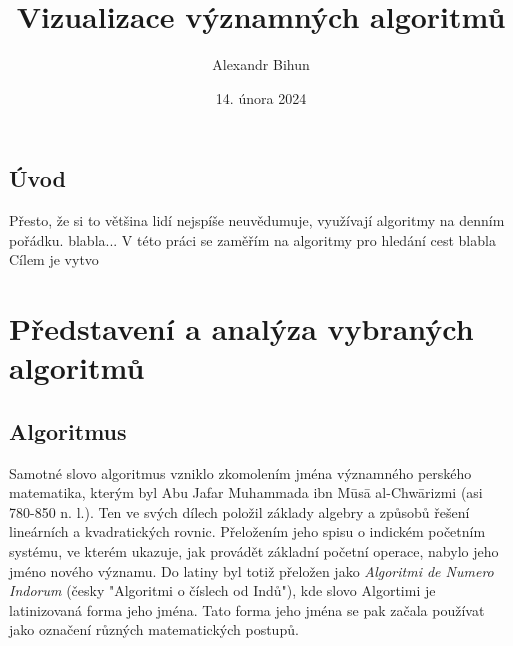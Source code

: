 \documentclass[12pt]{report}			%
\author{Alexandr Bihun}
\title{Vizualizace významných algoritmů}
\date{14. února 2024}
\begin{document}
	\mytitlepage						%
	
	
	
	
   {\tableofcontents\newpage}			%
	
	\chapter*{Úvod}
		Přesto, že si to většina lidí nejspíše neuvědumuje, využívají algoritmy na denním pořádku. blabla...	
		V této práci se zaměřím na algoritmy pro hledání cest	 blabla Cílem je vytvo
	
	
	\part{Představení a analýza vybraných algoritmů}
	
		\chapter{Algoritmus}
		Samotné slovo algoritmus vzniklo zkomolením jména významného perského matematika, kterým byl Abu Jafar Muhammada ibn Mūsā al-Chwārizmi (asi 780-850 n. l.). Ten ve svých dílech položil základy algebry a způsobů řešení lineárních a kvadratických rovnic. Přeložením jeho spisu o indickém početním systému, ve kterém ukazuje, jak provádět základní početní operace, nabylo jeho jméno nového významu. Do latiny byl totiž přeložen jako \emph{Algoritmi de Numero Indorum} (česky "Algoritmi o číslech od Indů"), kde slovo Algortimi je latinizovaná forma jeho jména. Tato forma jeho jména se pak začala používat jako označení různých matematických postupů. \cite{cerny} \cite{neckar} \cite{mehri}
			
\end{document}
